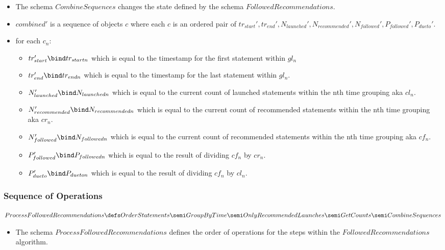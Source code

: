 \documentclass{article}
\begin{document}
\begin{itemize}
  \item The schema $CombineSequences$ changes the state defined by the
    schema $FollowedRecommendations$.
  \item $combined'$ is a sequence of objects $c$ where each $c$ is an
    ordered pair of $tr_{start}', tr_{end}', N_{launched}',
    N_{recommended}', N_{followed}', P_{followed}', P_{dueto}'$.
  \item for each $c_{n}$:
    \begin{itemize}
    \item  $tr_{start}' \bind tr_{startn}$ which is equal to the
      timestamp for the first statement within $gl_{n}$
    \item $tr_{end}' \bind tr_{endn}$ which is equal to the timestamp
      for the last statement within $gl_{n}$.
    \item $N_{launched}' \bind N_{launchedn}$ which is equal to the
      current count of launched statements within the nth time
      grouping aka $cl_{n}$.
    \item $N_{recommended}' \bind N_{recommendedn}$ which is equal to
      the current count of recommended statements within the nth time
      grouping aka $cr_{n}$.
    \item $N_{followed}' \bind N_{followedn}$ which is equal to the
      current count of recommended statements within the nth time
      grouping aka $cf_{n}$.
    \item $P_{followed}' \bind P_{followedn}$ which is equal to the
      result of dividing $cf_{n}$ by $cr_{n}$.
    \item $P_{dueto}' \bind P_{dueton}$ which is equal to the result
      of dividing $cf_{n}$ by $cl_{n}$.
    \end{itemize}
  \end{itemize}

\subsubsection{Sequence of Operations}
  $ProcessFollowedRecommendations \defs \\ OrderStatements \semi
  GroupByTime \semi OnlyRecommendedLaunches \semi \\ GetCounts \semi
  CombineSequences$
\begin{itemize}
\item The schema $ProcessFollowedRecommendations$ defines the order of
  operations for the steps within the $FollowedRecommendations$ algorithm.
\end{itemize}
\end{document}
